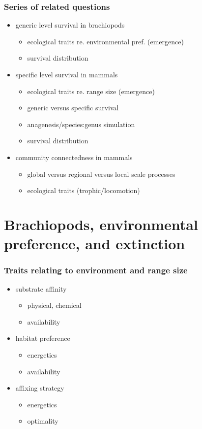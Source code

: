 \documentclass{beamer} \usepackage{amsmath,amsthm}
\begin{document}
\begin{frame}
  \frametitle{Series of related questions}

  \begin{itemize}
    \item generic level survival in brachiopods %
      \begin{itemize}
        \item ecological traits re. environmental pref. (emergence)
        \item survival distribution
      \end{itemize}
    \item specific level survival in mammals
      \begin{itemize}
        \item ecological traits re. range size (emergence)
        \item generic versus specific survival
        \item anagenesis/species:genus simulation
        \item survival distribution
      \end{itemize}
    \item community connectedness in mammals
      \begin{itemize}
        \item global versus regional versus local scale processes
        \item ecological traits (trophic/locomotion)
      \end{itemize}
  \end{itemize}
\end{frame}


\section{Brachiopods, environmental preference, and extinction}

\begin{frame}
  \frametitle{Traits relating to environment and range size}

  \begin{itemize}
    \item substrate affinity
      \begin{itemize}
        \item physical, chemical
        \item availability
      \end{itemize}
    \item habitat preference
      \begin{itemize}
        \item energetics
        \item availability
      \end{itemize}
    \item affixing strategy
      \begin{itemize}
        \item energetics
        \item optimality
      \end{itemize}
  \end{itemize}
\end{frame}
\end{document}
